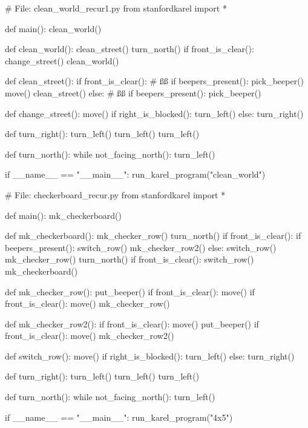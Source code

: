 \begin{py}
# File: clean_world_recur1.py
from stanfordkarel import *

def main():
    clean_world()

def clean_world():
    clean_street()
    turn_north()
    if front_is_clear():
        change_street()
        clean_world()

def clean_street():
    if front_is_clear():       # ßß
        if beepers_present():
            pick_beeper()
        move()
        clean_street()
    else:                      # ßß
        if beepers_present():
            pick_beeper()

def change_street():
    move()
    if right_is_blocked():
        turn_left()
    else:
        turn_right()

def turn_right():
    turn_left()
    turn_left()
    turn_left()

def turn_north():
    while not_facing_north():
        turn_left()

if __name__ == "__main__":
    run_karel_program("clean_world")
\end{py}
%

%
\begin{py}
# File: checkerboard_recur.py
from stanfordkarel import *

def main():
    mk_checkerboard()

def mk_checkerboard():
    mk_checker_row()
    turn_north()
    if front_is_clear():
        if beepers_present():
            switch_row()
            mk_checker_row2()
        else:
            switch_row()
            mk_checker_row()
        turn_north()
        if front_is_clear():
            switch_row()
            mk_checkerboard()

def mk_checker_row():
    put_beeper()
    if front_is_clear():
        move()
        if front_is_clear():
            move()
            mk_checker_row()

def mk_checker_row2():
    if front_is_clear():
        move()
        put_beeper()
        if front_is_clear():
            move()
            mk_checker_row2()

def switch_row():
    move()
    if right_is_blocked():
        turn_left()
    else:
        turn_right()

def turn_right():
    turn_left()
    turn_left()
    turn_left()

def turn_north():
    while not_facing_north():
        turn_left()

if __name__ == "__main__":
    run_karel_program("4x5")
\end{py}
%